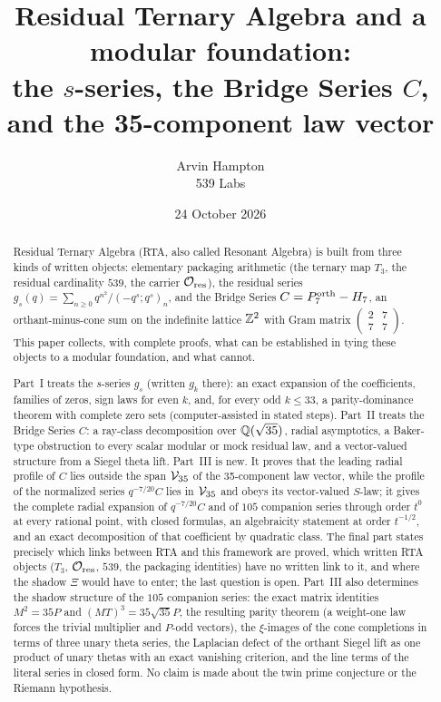 \title{Residual Ternary Algebra and a modular foundation:\\ the $s$-series, the Bridge Series $C$, and the 35-component law vector}
\author{Arvin Hampton\\ \small 539 Labs}
\date{24 October 2026}

\maketitle
\begin{abstract}
Residual Ternary Algebra (RTA, also called Resonant Algebra) is built from three kinds of written objects: elementary packaging arithmetic
(the ternary map $T_3$, the residual cardinality $539$, the carrier $\mathcal O_{\rm res}$), the residual series
$g_s(q)=\sum_{n\ge0}q^{n^2}/(-q^s;q^s)_n$, and the Bridge Series $C=P^{\mathrm{orth}}_7-H_7$, an orthant-minus-cone sum on the indefinite lattice
$\mathbb{Z}^2$ with Gram matrix $\left(\begin{smallmatrix}2&7\\7&7\end{smallmatrix}\right)$. This paper collects, with complete proofs, what can be
established in tying these objects to a modular foundation, and what cannot.

Part~I treats the $s$-series $g_s$ (written $g_k$ there): an exact expansion of the coefficients, families of zeros, sign laws for even $k$,
and, for every odd $k\le33$, a parity-dominance theorem with complete zero sets (computer-assisted in stated steps). Part~II treats the Bridge
Series $C$: a ray-class decomposition over $\mathbb{Q}(\sqrt{35})$, radial asymptotics, a Baker-type obstruction to every scalar modular or mock residual law,
and a vector-valued structure from a Siegel theta lift. Part~III is new. It proves that the leading radial profile of $C$ lies outside the span
$\mathcal V_{35}$ of the 35-component law vector, while the profile of the normalized series $q^{-7/20}C$ lies in $\mathcal V_{35}$ and obeys its vector-valued
$S$-law; it gives the complete radial expansion of $q^{-7/20}C$ and of $105$ companion series through order $t^0$ at every rational point,
with closed formulas, an algebraicity statement at order $t^{-1/2}$, and an exact decomposition of that coefficient by quadratic class.
The final part states precisely which links between RTA and this framework are proved, which written RTA objects ($T_3$, $\mathcal O_{\rm res}$,
$539$, the packaging identities) have no written link to it, and where the shadow $\Xi$ would have to enter; the last question is open.
Part~III also determines the shadow structure of the $105$ companion series: the exact matrix identities $M^2=35P$ and $(MT)^3=35\sqrt{35}P$, the resulting parity
theorem (a weight-one law forces the trivial multiplier and $P$-odd vectors), the $\xi$-images of the cone completions in terms of three unary theta series, the Laplacian
defect of the orthant Siegel lift as one product of unary thetas with an exact vanishing criterion, and the line terms of the literal series in closed form.
No claim is made about the twin prime conjecture or the Riemann hypothesis.
\end{abstract}
\tableofcontents
\clearpage

